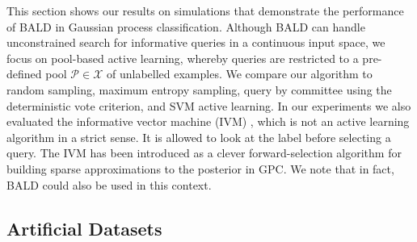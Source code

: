\documentclass[twoside]{article}
\begin{document}
This section shows our results on simulations that demonstrate the performance of BALD in Gaussian process classification. Although BALD can handle unconstrained search for informative queries in a continuous input space, we focus on pool-based active learning, whereby queries are restricted to a pre-defined pool $\mathcal{P}\in\mathcal{X}$ of unlabelled examples. We compare our algorithm to random sampling, maximum entropy sampling, query by committee using the deterministic vote criterion, and SVM active learning. In our experiments we also evaluated the informative vector machine (IVM) \cite{Lawrence04}, which is not an active learning algorithm in a strict sense. It is allowed to look at the label before selecting a query. The IVM has been introduced as a clever forward-selection algorithm for building sparse approximations to the posterior in GPC. We note that in fact, BALD could also be used in this context.

\begin{table}
\label{tableinfoloss}
\caption{Percentage approximation error ($\pm$1 s.d.) \emph{Rows:} methods of approximate inference. \emph{Columns:} approximation methods for evaluating Eqn.\ \ref{eqn:mean_entropy}. The results indicate that $\stackrel{2}{\approx}$ is a very accurate approximation (Figure \ref{fig:trick}). EP causes some loss and Laplace significantly more, which is not surprising in the light of the results presented in \cite{Kuss05}.}
\end{table}

\subsection{Artificial Datasets}
\end{document}
